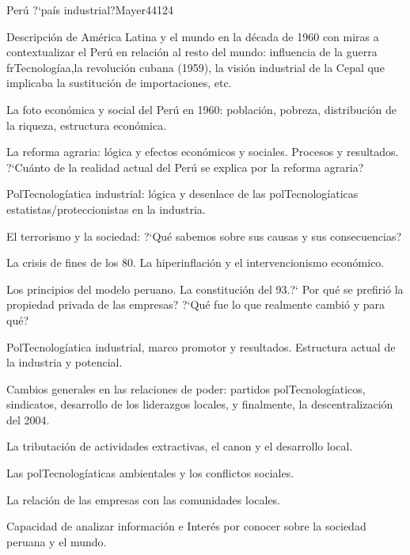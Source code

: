 \begin{syllabus}
\begin{unit}{Perú ?`país industrial?}{}{Mayer44}{12}{4}
   \begin{topics}
      \item Descripción de América Latina y el mundo en la década de 1960 con miras a contextualizar el Perú en relación al resto del mundo: influencia de la guerra frTecnologíaa,la revolución cubana (1959), la visión industrial de la Cepal que implicaba la sustitución de importaciones, etc.
      \item La foto económica y social del Perú en 1960: población, pobreza, distribución de la riqueza, estructura económica.
      \item La reforma agraria: lógica y efectos económicos y sociales. Procesos y resultados. ?`Cuánto de la realidad actual del Perú se explica por la reforma agraria?
      \item PolTecnologíatica industrial: lógica y desenlace de las polTecnologíaticas estatistas/proteccionistas en la industria.
      \item El terrorismo y la sociedad: ?`Qué sabemos sobre sus causas y sus consecuencias?
      \item La crisis de fines de los 80. La hiperinflación y el intervencionismo económico.
      \item Los principios del modelo peruano. La constitución del 93.?` Por qué se prefirió la propiedad privada de las empresas? ?`Qué fue lo que realmente cambió y para qué?
      \item PolTecnologíatica industrial, marco promotor y resultados. Estructura actual de la industria y potencial.
      \item Cambios generales en las relaciones de poder: partidos polTecnologíaticos, sindicatos, desarrollo de los liderazgos locales, y finalmente, la descentralización del 2004.
      \item La tributación de actividades extractivas, el canon y el desarrollo local.
      \item Las polTecnologíaticas ambientales y los conflictos sociales.
      \item La relación de las empresas con las comunidades locales.
   \end{topics}
   \begin{learningoutcomes}
      \item Capacidad de analizar información e Interés por conocer sobre la sociedad peruana y el mundo.
   \end{learningoutcomes}
\end{unit}



\begin{coursebibliography}
\end{coursebibliography}

\end{syllabus}
